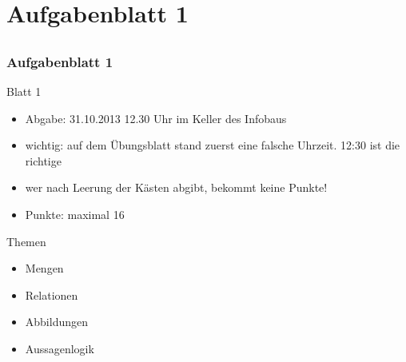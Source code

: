 \section[Blatt 1]{Aufgabenblatt 1}
\subsection*{}
\begin{frame}
        \frametitle{Aufgabenblatt 1}
        \begin{block}{Blatt 1}
        \begin{itemize}
        	\item Abgabe: 31.10.2013 12.30 Uhr im Keller des Infobaus
        	\item wichtig: auf dem Übungsblatt stand zuerst eine falsche Uhrzeit. 12:30 ist die richtige
          \item wer nach Leerung der Kästen abgibt, bekommt keine Punkte!
        	\item Punkte: maximal 16
        \end{itemize}
        \end{block}
        \begin{block}{Themen}
        \begin{itemize}
			\item Mengen
        	\item Relationen
        	\item Abbildungen
        	\item Aussagenlogik
        \end{itemize}
        \end{block}
\end{frame}


